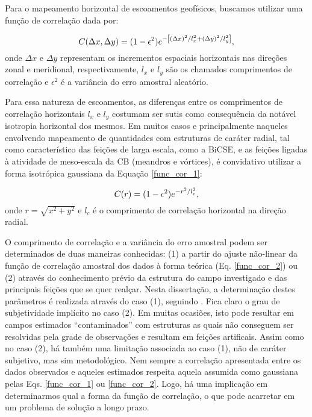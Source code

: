 \documentclass[12pt,portuguese,a4paper,pdftex]{article}
\begin{document}
Para o mapeamento horizontal de escoamentos geofísicos, buscamos utilizar uma função 
de correlação dada por:

\begin{equation}
C(\Delta x,\Delta y) = (1-\epsilon^{2})e^{-\left [ (\Delta x)^2/l_x^2 + (\Delta y)^2/l_y^2 \right ]},
\vspace{0.25cm}
\label{func_cor_1}
\end{equation}
onde $\Delta x$ e $\Delta y$ representam os incrementos espaciais horizontais nas 
direções zonal e meridional, respectivamente, $l_x$ e $l_y$ são os chamados comprimentos de 
correlação e $\epsilon^{2}$ é a variância do erro amostral aleatório.

Para essa natureza de escoamentos, as diferenças entre os comprimentos de correla\-ção 
horizontais $l_x$ e $l_y$ costumam ser sutis como consequência da notável isotropia horizontal dos 
mesmos. Em muitos casos e principalmente naqueles envolvendo mapeamento de quantidades 
com estruturas de caráter radial, tal como característico das feições de larga escala, como a BiCSE,
e as feições ligadas à atividade de meso-escala da CB (meandros e vórtices),
é convidativo utilizar a forma isotrópica gaussiana da Equação \ref{func_cor_1}:

\begin{equation}
C(r) = (1-\epsilon^{2})e^{-{r^2/l_c^2}},
\vspace{0.25cm}
\label{func_cor_2}
\end{equation}
onde $r = \sqrt{x^2 + y^2}$ e $l_c$ é o comprimento de correlação horizontal na 
direção radial.

O comprimento de correlação e a variância do erro amostral podem ser determinados 
de duas maneiras conhecidas: (1) a partir do ajuste não-linear da função de correlação amostral 
dos dados à forma teórica (Eq. \ref{func_cor_2}) ou (2) através do conhecimento prévio da 
estrutura do campo investigado e das principais feições que se quer realçar. Nesta dissertação, 
a determinação destes parâmetros é realizada através do caso (1), seguindo \cite{silveira_etal2000B}. 
Fica claro o grau de subjetividade implícito no caso (2). Em muitas ocasiões, isto pode resultar 
em campos estimados ``contaminados'' com estruturas as quais não conseguem ser resolvidas pela 
grade de observações e resultam em feições artificais. Assim como no caso (2), há também uma 
limitação associada ao caso (1), não de caráter 
subjetivo, mas sim metodológico. Nem sempre a correlação apresentada entre os dados observados e 
aqueles estimados respeita aquela assumida como gaussiana pelas Eqs. \ref{func_cor_1} ou 
\ref{func_cor_2}. Logo, há uma implicação em determinarmos qual a forma da função de correlação, 
o que pode acarretar em um problema de solução a longo prazo.
\end{document}
